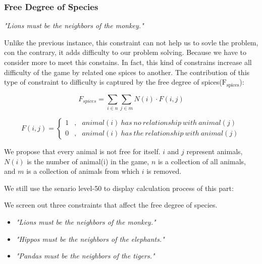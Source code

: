 \documentclass{mcmthesis}
\begin{document}
				
			
			\subsubsection{Free Degree of Species}
			
				
				\begin{center} 
					\emph{"Lions must be the neighbors of the monkey."}
				\end{center}
				
				Unlike the previous instance, this constraint can not help us to sovle the problem, con the contrary, it adds difficulty to our problem solving. Because we have to consider more to meet this constains. In fact, this kind of constrains increase all difficulty of the game by related one spices to another. The contribution of this type of constraint to difficulty is captured by the free degree of spices($\mathrm{F_{spices}}$):
				
				\begin{equation}
				F_{spices} = \sum _ { i \in n } \sum _ { j \in m } N (i) \cdot F ( i , j )
				\end{equation}
				
				$$ F(i,j)=\left\{
				\begin{aligned}
				1 & , & animal(i)\ has\ no\ relationship\ with\ animal(j) \\
				0 & , & animal(i)\ has\ the\ relationship\ with\ animal(j)
				\end{aligned}
				\right.
				$$
				
				We propose that every animal is not free for itself. $i$ and $j$ represent animals, $N(i)$ is the number of animal(i) in the game, $n$ is a collection of all animals, and $m$ is a collection of animals from which $i$ is removed.
				
				We still use the senario level-50 to display calculation process of this part:
				
				We screen out three constraints that affect the free degree of species.

				
				\begin{itemize}
					\item \emph{"Lions must be the neighbors of the monkey."}
					\item \emph{"Hippos must be the neighbors of the elephants."}
					\item \emph{"Pandas must be the neighbors of the tigers."}
				\end{itemize}
			
\end{document}
